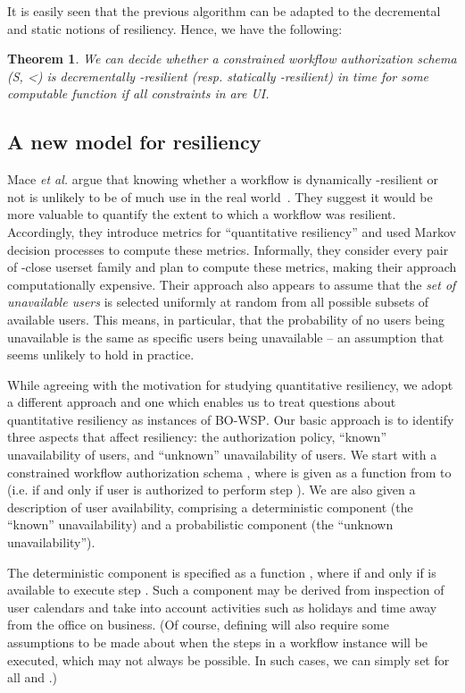\documentclass[jcs,crcready]{iosart1c}
\newtheorem{thm}{Theorem}
\newcommand{\etal}{\textit{et al.}\xspace}
\newcommand{\BOWSP}{\textsc{BO-WSP}\xspace}
\begin{document}
It is easily seen that the previous algorithm can be adapted to the decremental and static notions of resiliency. Hence, we have the following:

\begin{thm}
We can decide whether a constrained workflow authorization schema (S, <) is decrementally -resilient (resp. statically -resilient) in time  for some computable function  if all constraints in  are UI.
\end{thm}


\subsection{A new model for resiliency}

Mace \etal argue that knowing whether a workflow is dynamically -resilient or not is unlikely to be of much use in the real world~\cite{MaMoMo14}.
They suggest it would be more valuable to quantify the extent to which a workflow was resilient.
Accordingly, they introduce metrics for ``quantitative resiliency'' and used Markov decision processes to compute these metrics.
Informally, they consider every pair of -close userset family and plan to compute these metrics, making their approach computationally expensive.
Their approach also appears to assume that the \emph{set of unavailable users} is selected uniformly at random from all possible subsets of available users. 
This means, in particular, that the probability of no users being unavailable is the same as  specific users being unavailable -- an assumption that seems unlikely to hold in practice.

While agreeing with the motivation for studying quantitative resiliency, we adopt a different approach and one which enables us to treat questions about quantitative resiliency as instances of \BOWSP.
Our basic approach is to identify three aspects that affect resiliency: the authorization policy, ``known'' unavailability of users, and ``unknown'' unavailability of users.
We start with a constrained workflow authorization schema  , where  is given as a function from  to  (i.e.  if and only if user  is authorized to perform step ). 
We are also given a description of user availability, comprising a deterministic component (the ``known'' unavailability) and a probabilistic component (the ``unknown unavailability'').

The deterministic component is specified as a function , where  if and only if  is available to execute step .
Such a component may be derived from inspection of user calendars and take into account activities such as holidays and time away from the office on business.
(Of course, defining  will also require some assumptions to be made about when the steps in a workflow instance will be executed, which may not always be possible.
In such cases, we can simply set  for all  and .)
 
\end{document}
